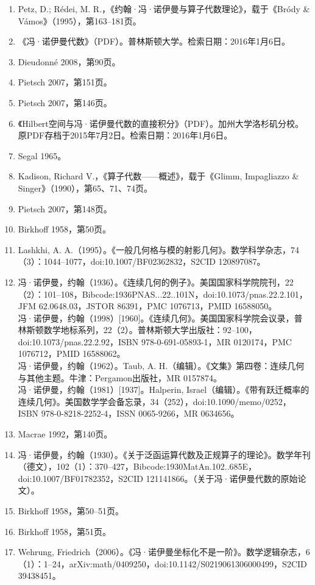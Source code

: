 \begin{enumerate}
\item Petz, D.; Rédei, M. R.，《约翰·冯·诺伊曼与算子代数理论》，载于《Bródy & Vámos》（1995），第163–181页。  
\item 《冯·诺伊曼代数》（PDF）。普林斯顿大学。检索日期：2016年1月6日。  
\item Dieudonné 2008，第90页。  
\item Pietsch 2007，第151页。  
\item Pietsch 2007，第146页。  
\item 《Hilbert空间与冯·诺伊曼代数的直接积分》（PDF）。加州大学洛杉矶分校。原PDF存档于2015年7月2日。检索日期：2016年1月6日。  
\item Segal 1965。  
\item Kadison, Richard V.，《算子代数——概述》，载于《Glimm, Impagliazzo & Singer》（1990），第65、71、74页。  
\item Pietsch 2007，第148页。  
\item Birkhoff 1958，第50页。
\item Lashkhi, A. A.（1995）。《一般几何格与模的射影几何》。数学科学杂志，74（3）：1044–1077，doi:10.1007/BF02362832，S2CID 120897087。  
\item 冯·诺伊曼，约翰（1936）。《连续几何的例子》。美国国家科学院院刊，22（2）：101–108，Bibcode:1936PNAS...22..101N，doi:10.1073/pnas.22.2.101，JFM 62.0648.03，JSTOR 86391，PMC 1076713，PMID 16588050。\\  
冯·诺伊曼，约翰（1998）[1960]。《连续几何》。美国国家科学院会议录，普林斯顿数学地标系列，22（2）。普林斯顿大学出版社：92–100，doi:10.1073/pnas.22.2.92，ISBN 978-0-691-05893-1，MR 0120174，PMC 1076712，PMID 16588062。\\  
冯·诺伊曼，约翰（1962）。Taub, A. H.（编辑）。《文集》第四卷：连续几何与其他主题。牛津：Pergamon出版社，MR 0157874。\\  
冯·诺伊曼，约翰（1981）[1937]。Halperin, Israel（编辑）。《带有跃迁概率的连续几何》。美国数学学会备忘录，34（252），doi:10.1090/memo/0252，ISBN 978-0-8218-2252-4，ISSN 0065-9266，MR 0634656。\\  
\item Macrae 1992，第140页。  
\item 冯·诺伊曼，约翰（1930）。《关于泛函运算代数及正规算子的理论》。数学年刊（德文），102（1）：370–427，Bibcode:1930MatAn.102..685E，doi:10.1007/BF01782352，S2CID 121141866。（关于冯·诺伊曼代数的原始论文）。  
\item Birkhoff 1958，第50–51页。  
\item Birkhoff 1958，第51页。  
\item Wehrung, Friedrich（2006）。《冯·诺伊曼坐标化不是一阶》。数学逻辑杂志，6（1）：1–24，arXiv:math/0409250，doi:10.1142/S0219061306000499，S2CID 39438451。

\end{enumerate}
